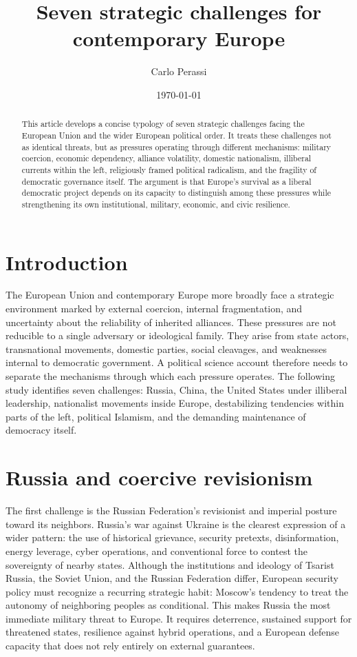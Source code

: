 \documentclass[11pt]{article}
\title{Seven strategic challenges for contemporary Europe}
\author{Carlo Perassi}
\date{\today}
\begin{document}
\maketitle

\begin{abstract}
	This article develops a concise typology of seven strategic challenges facing the European Union and the wider European political order. It treats these challenges not as identical threats, but as pressures operating through different mechanisms: military coercion, economic dependency, alliance volatility, domestic nationalism, illiberal currents within the left, religiously framed political radicalism, and the fragility of democratic governance itself. The argument is that Europe's survival as a liberal democratic project depends on its capacity to distinguish among these pressures while strengthening its own institutional, military, economic, and civic resilience.
\end{abstract}

\section{Introduction}

The European Union and contemporary Europe more broadly face a strategic environment marked by external coercion, internal fragmentation, and uncertainty about the reliability of inherited alliances. These pressures are not reducible to a single adversary or ideological family. They arise from state actors, transnational movements, domestic parties, social cleavages, and weaknesses internal to democratic government. A political science account therefore needs to separate the mechanisms through which each pressure operates. The following study identifies seven challenges: Russia, China, the United States under illiberal leadership, nationalist movements inside Europe, destabilizing tendencies within parts of the left, political Islamism, and the demanding maintenance of democracy itself.

\section{Russia and coercive revisionism}

The first challenge is the Russian Federation's revisionist and imperial posture toward its neighbors. Russia's war against Ukraine is the clearest expression of a wider pattern: the use of historical grievance, security pretexts, disinformation, energy leverage, cyber operations, and conventional force to contest the sovereignty of nearby states. Although the institutions and ideology of Tsarist Russia, the Soviet Union, and the Russian Federation differ, European security policy must recognize a recurring strategic habit: Moscow's tendency to treat the autonomy of neighboring peoples as conditional. This makes Russia the most immediate military threat to Europe. It requires deterrence, sustained support for threatened states, resilience against hybrid operations, and a European defense capacity that does not rely entirely on external guarantees.
\end{document}
